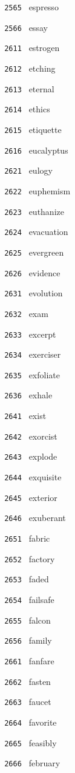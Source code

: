\documentclass[11pt]{article}
\begin{document}
\begin{multicols}{6}
\noindent \texttt{ 2565 } espresso  \par
\noindent \texttt{ 2566 } essay  \par
\noindent \texttt{ 2611 } estrogen  \par
\noindent \texttt{ 2612 } etching  \par
\noindent \texttt{ 2613 } eternal  \par
\noindent \texttt{ 2614 } ethics  \par
\noindent \texttt{ 2615 } etiquette  \par
\noindent \texttt{ 2616 } eucalyptus  \par
\vspace{3mm}
\noindent \texttt{ 2621 } eulogy  \par
\noindent \texttt{ 2622 } euphemism  \par
\noindent \texttt{ 2623 } euthanize  \par
\noindent \texttt{ 2624 } evacuation  \par
\noindent \texttt{ 2625 } evergreen  \par
\noindent \texttt{ 2626 } evidence  \par
\vspace{3mm}
\noindent \texttt{ 2631 } evolution  \par
\noindent \texttt{ 2632 } exam  \par
\noindent \texttt{ 2633 } excerpt  \par
\noindent \texttt{ 2634 } exerciser  \par
\noindent \texttt{ 2635 } exfoliate  \par
\noindent \texttt{ 2636 } exhale  \par
\vspace{3mm}
\noindent \texttt{ 2641 } exist  \par
\noindent \texttt{ 2642 } exorcist  \par
\noindent \texttt{ 2643 } explode  \par
\noindent \texttt{ 2644 } exquisite  \par
\noindent \texttt{ 2645 } exterior  \par
\noindent \texttt{ 2646 } exuberant  \par
\vspace{3mm}
\noindent \texttt{ 2651 } fabric  \par
\noindent \texttt{ 2652 } factory  \par
\noindent \texttt{ 2653 } faded  \par
\noindent \texttt{ 2654 } failsafe  \par
\noindent \texttt{ 2655 } falcon  \par
\noindent \texttt{ 2656 } family  \par
\vspace{3mm}
\noindent \texttt{ 2661 } fanfare  \par
\noindent \texttt{ 2662 } fasten  \par
\noindent \texttt{ 2663 } faucet  \par
\noindent \texttt{ 2664 } favorite  \par
\noindent \texttt{ 2665 } feasibly  \par
\noindent \texttt{ 2666 } february  \par
\end{multicols}
\end{document}
